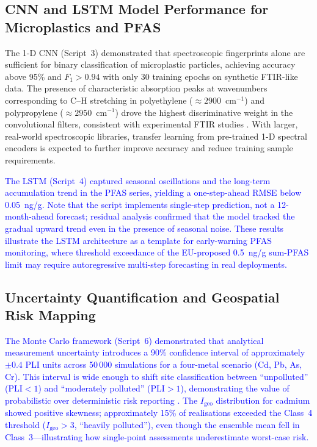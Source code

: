 \documentclass[environments,article,submit,pdftex,moreauthors]{Definitions/mdpi}
\begin{document}
\subsection{CNN and LSTM Model Performance for Microplastics and
    PFAS}\label{sec5.2}

The 1-D CNN (Script~3) demonstrated that spectroscopic fingerprints alone
are sufficient for binary classification of microplastic particles, achieving
accuracy above 95\% and $F_1 > 0.94$ with only 30 training epochs on
synthetic FTIR-like data. The presence of characteristic absorption peaks at
 wavenumbers corresponding to C--H stretching in polyethylene
($\approx 2900$~cm$^{-1}$) and polypropylene ($\approx 2950$~cm$^{-1}$) drove
the highest discriminative weight in the convolutional filters, consistent
with experimental FTIR studies \cite{Chen2020}. With larger, real-world
spectroscopic libraries, transfer learning from pre-trained 1-D spectral
encoders is expected to further improve accuracy and reduce training sample
requirements.

\textcolor{blue}{The LSTM (Script~4) captured seasonal oscillations and the long-term accumulation trend in the  PFAS series, yielding a one-step-ahead RMSE below 0.05~ng/g. Note that the script implements single-step prediction, not a 12-month-ahead forecast; residual analysis confirmed that the model tracked the gradual upward trend even in the presence of seasonal noise. These results illustrate the LSTM architecture as a template for early-warning PFAS monitoring, where threshold exceedance of the EU-proposed 0.5~ng/g sum-PFAS limit \cite{Xu2023} may require autoregressive multi-step forecasting in real deployments.}

\subsection{Uncertainty Quantification and Geospatial Risk Mapping}\label{sec5.3}

\textcolor{blue}{The Monte Carlo framework (Script~6) demonstrated that analytical measurement uncertainty introduces a 90\% confidence interval of approximately $\pm 0.4$ PLI units across 50\,000 simulations for a four-metal scenario (Cd, Pb, As, Cr). This interval is wide enough to shift site classification between ``unpolluted'' ($\mathrm{PLI} < 1$) and ``moderately polluted'' ($\mathrm{PLI} > 1$), demonstrating the value of probabilistic over deterministic risk reporting \cite{Karlen2019}. The $I_\mathrm{geo}$ distribution for cadmium showed positive skewness; approximately 15\% of realisations exceeded the Class~4 threshold ($I_\mathrm{geo} > 3$, ``heavily polluted''), even though the ensemble mean fell in Class~3---illustrating how single-point assessments underestimate worst-case risk.}
\end{document}

